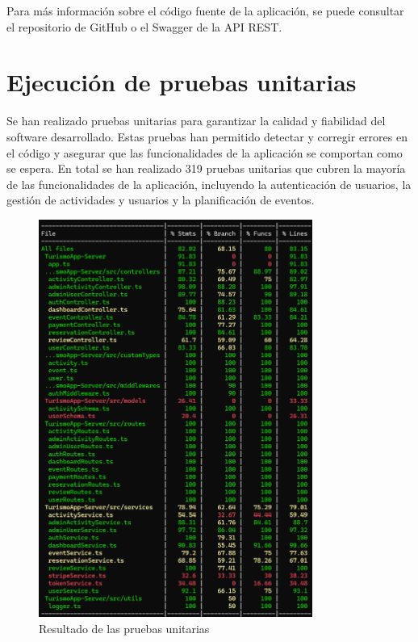 Para más información sobre el código fuente de la aplicación, se puede consultar el repositorio de GitHub o el Swagger de la API REST.

\section{Ejecución de pruebas unitarias}
Se han realizado pruebas unitarias para garantizar la calidad y fiabilidad del software desarrollado. Estas pruebas han permitido detectar y corregir errores en el código y asegurar que las funcionalidades de la aplicación se comportan como se espera.
En total se han realizado 319 pruebas unitarias que cubren la mayoría de las funcionalidades de la aplicación, incluyendo la autenticación de usuarios, la gestión de actividades y usuarios y la planificación de eventos.
\begin{figure}[H]
	\centering
	\includegraphics[width=0.8\textwidth]{7-Construccion/Pruebas/unitarias.png}
	\caption{Resultado de las pruebas unitarias}
\end{figure}

